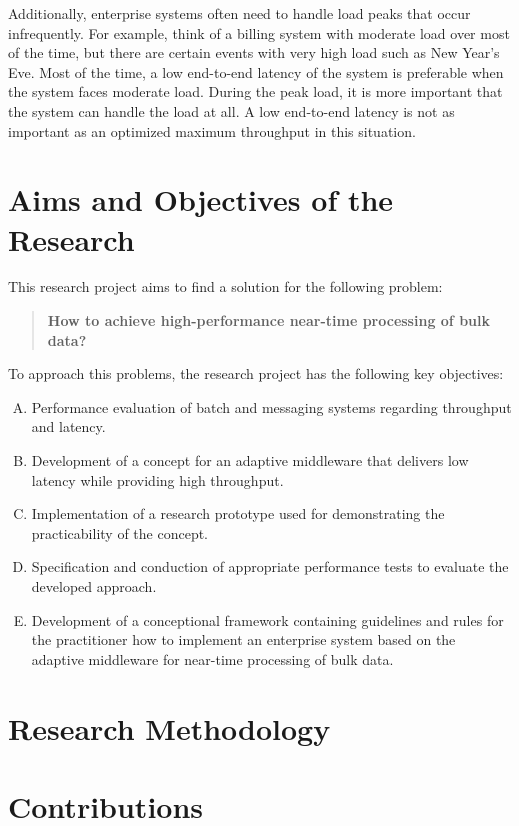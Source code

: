 Additionally, enterprise systems often need to handle load peaks that occur infrequently. For example, think of a billing system with moderate load over most of the time, but there are certain events with very high load such as New Year's Eve. Most of the time, a low end-to-end latency of the system is preferable when the system faces moderate load. During the peak load, it is more important that the system can handle the load at all. A low end-to-end latency is not as important as an optimized maximum throughput in this situation.

\section{Aims and Objectives of the Research}\label{sec:research_objectives}
This research project aims to find a solution for the following problem:
\begin{quote}
\textbf{How to achieve high-performance near-time processing of bulk data?}
\end{quote}
To approach this problems, the research project has the following key objectives:
\begin{enumerate}[A.]
	\item Performance evaluation of batch and messaging systems regarding throughput and latency.
	\item Development of a concept for an adaptive middleware that delivers low latency while providing high throughput.
	\item Implementation of a research prototype used for demonstrating the practicability of the concept.
	\item Specification and conduction of appropriate performance tests to evaluate the developed approach.
	\item Development of a conceptional framework containing guidelines and rules for the practitioner how to implement an enterprise system based on the adaptive middleware for near-time processing of bulk data.
\end{enumerate}

\section{Research Methodology}

\section{Contributions}\label{sec:contributions}

